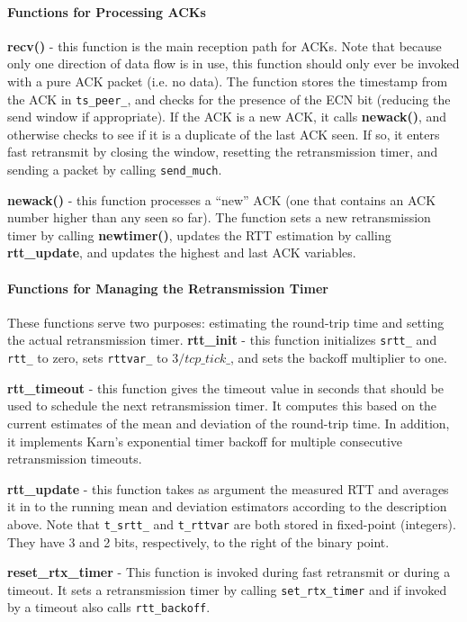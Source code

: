 \paragraph{Functions for Processing ACKs}

{\bf recv()} - this function is the main reception path for ACKs.
Note that because only one direction of data flow is in use, this function
should only ever be invoked with a pure ACK packet (i.e. no data).
The function stores the timestamp from the ACK in {\tt ts\_peer\_}, and
checks for the presence of the ECN bit (reducing the send window if
appropriate).
If the ACK is a new ACK, it calls {\bf newack()}, and otherwise
checks to see if it is a duplicate of the last ACK seen.
If so, it enters fast retransmit by closing the window, resetting the
retransmission timer, and sending a packet by calling {\tt send\_much}.

{\bf newack()} - this function processes a ``new'' ACK (one that contains
an ACK number higher than any seen so far).
The function sets a new retransmission timer by calling {\bf newtimer()},
updates the RTT estimation by calling {\bf rtt\_update}, and updates
the highest and last ACK variables.

\paragraph{Functions for Managing the Retransmission Timer}

These functions serve two purposes: estimating the round-trip time
and setting the actual retransmission timer.
{\bf rtt\_init} - this function initializes {\tt srtt\_} and {\tt rtt\_}
to zero, sets {\tt rttvar\_} to $3/tcp\_tick\_$, and sets the backoff
multiplier to one.

{\bf rtt\_timeout} - this function gives the timeout value in seconds that
should be used to schedule the next retransmission timer.
It computes this based on the current estimates of the mean and deviation
of the round-trip time.  In addition, it implements Karn's
exponential timer backoff for multiple consecutive retransmission timeouts.

{\bf rtt\_update} - this function takes as argument the measured RTT
and averages it in to the running mean and deviation estimators
according to the description above.
Note that {\tt t\_srtt\_} and {\tt t\_rttvar} are both
stored in fixed-point (integers).
They have 3 and 2 bits, respectively, to the right of the binary
point.

{\bf reset\_rtx\_timer} -  This function is invoked during fast retransmit
or during a timeout.
It sets a retransmission timer
by calling {\tt set\_rtx\_timer} and if invoked by a timeout also calls
{\tt rtt\_backoff}.

